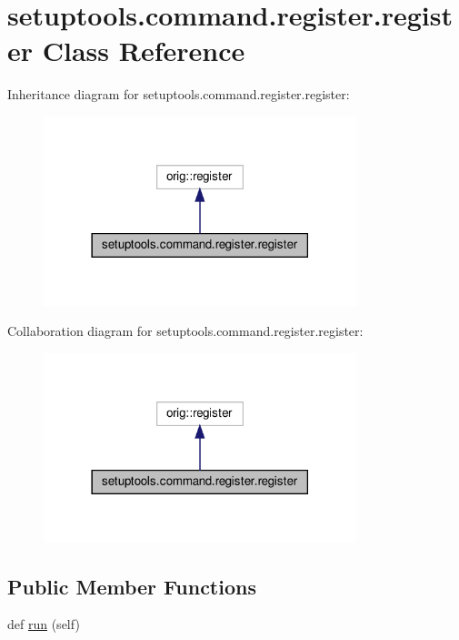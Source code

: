 \hypertarget{classsetuptools_1_1command_1_1register_1_1register}{}\section{setuptools.\+command.\+register.\+register Class Reference}
\label{classsetuptools_1_1command_1_1register_1_1register}


Inheritance diagram for setuptools.\+command.\+register.\+register\+:
\nopagebreak
\begin{figure}[H]
\begin{center}
\leavevmode
\includegraphics[width=258pt]{classsetuptools_1_1command_1_1register_1_1register__inherit__graph}
\end{center}
\end{figure}


Collaboration diagram for setuptools.\+command.\+register.\+register\+:
\nopagebreak
\begin{figure}[H]
\begin{center}
\leavevmode
\includegraphics[width=258pt]{classsetuptools_1_1command_1_1register_1_1register__coll__graph}
\end{center}
\end{figure}
\subsection*{Public Member Functions}
\begin{DoxyCompactItemize}
\item 
def \hyperlink{classsetuptools_1_1command_1_1register_1_1register_a621e5757f6735b719df3425069768eb9}{run} (self)
\end{DoxyCompactItemize}


